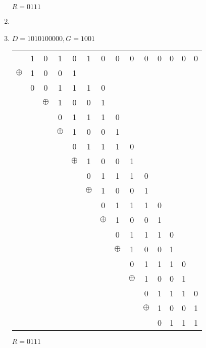 \documentclass[12pt, a4paper]{article}
\begin{document}
\begin{enumerate}[a]
	$R = 0111$
	\item %
	\item %
	$D = 1010100000, G = 1001$

	\begin{tabular}{cccccccccccccc}
		& 1 & 0 & 1 & 0 & 1 & 0 & 0 & 0 & 0 & 0 & 0 & 0 & 0\\
		$\oplus$ & 1 & 0 & 0 & 1\\\cline{2-5}
		& 0 & 0 & 1 & 1 & 1 & 0\\
		&& $\oplus$ & 1 & 0 & 0 & 1\\\cline{4-7}
		&&& 0 & 1 & 1 & 1 & 0\\
		&&& $\oplus$ & 1 & 0 & 0 & 1\\\cline{5-8}
		&&&& 0 & 1 & 1 & 1 & 0\\
		&&&& $\oplus$ & 1 & 0 & 0 & 1\\\cline{6-9}
		&&&&& 0 & 1 & 1 & 1 & 0\\
		&&&&& $\oplus$ & 1 & 0 & 0 & 1\\\cline{7-10}
		&&&&&& 0 & 1 & 1 & 1 & 0\\
		&&&&&& $\oplus$ & 1 & 0 & 0 & 1\\\cline{8-11}
		&&&&&&& 0 & 1 & 1 & 1 & 0\\
		&&&&&&& $\oplus$ & 1 & 0 & 0 & 1\\\cline{9-12}
		&&&&&&&& 0 & 1 & 1 & 1 & 0\\
		&&&&&&&& $\oplus$ & 1 & 0 & 0 & 1\\\cline{10-13}
		&&&&&&&&& 0 & 1 & 1 & 1 & 0\\
		&&&&&&&&& $\oplus$ & 1 & 0 & 0 & 1\\\cline{11-14}
		&&&&&&&&&& 0 & 1 & 1 & 1\\
	\end{tabular}

	$R = 0111$
\end{enumerate}
\end{document}

